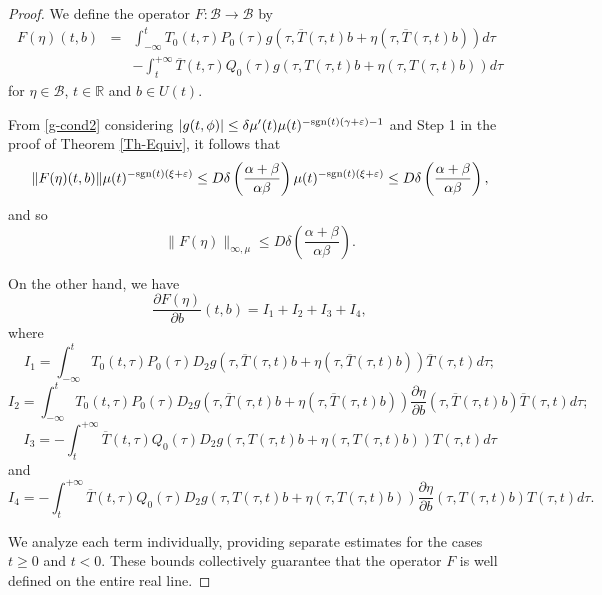 \documentclass[9pt]{amsart}
\numberwithin{equation}{section}
\numberwithin{lemma}{section}
\begin{document}
\begin{proof}
    We define the operator $F\colon\mathcal{B}\to \mathcal{B}$ by
    \begin{equation*}
        \begin{array}{rcl}
            F(\eta)(t,b) & = & \displaystyle\int_{-\infty}^{t} T_0(t,\tau)P_0(\tau)g(\tau,\overline{T}(\tau,t)b+\eta(\tau,\overline{T}(\tau,t)b))d\tau \\
             & & -\displaystyle\int_{t}^{+\infty}\overline{T}(t,\tau)Q_0(\tau)g(\tau, T(\tau,t)b+\eta(\tau,T(\tau,t)b))d\tau
        \end{array}
    \end{equation*}
    for $\eta\in\mathcal{B}$, $t\in\mathbb{R}$ and $b\in U(t)$.

    From \eqref{g-cond2} considering $|g(t,\phi)|\leq \delta\mu'(t)\mu(t)^{-\textnormal{sgn}(t)(\gamma+\varepsilon)-1}$  and Step 1 in the proof of Theorem \ref{Th-Equiv}, it follows that
    $$\|F(\eta)(t,b)\|\mu(t)^{-\textnormal{sgn}(t)(\xi+\varepsilon)}\leq D\delta\left(\frac{\alpha+\beta}{\alpha\beta}\right)\mu(t)^{-\textnormal{sgn}(t)(\xi+\varepsilon)}\leq D\delta\left(\frac{\alpha+\beta}{\alpha\beta}\right),$$
    and so
    \begin{equation}\label{F-cota-mu}
        \|F(\eta)\|_{\infty,\mu} \leq D\delta\left(\frac{\alpha+\beta}{\alpha\beta}\right).
    \end{equation}

    On the other hand, we have 
$$ \displaystyle{\frac{\partial F(\eta)}{\partial b}(t,b)}= I_1 + I_2 + I_3 + I_4,$$
where
$$I_1 = \displaystyle\int_{-\infty}^{t}T_0(t,\tau)P_0(\tau)D_2g(\tau,\overline{T}(\tau,t)b+\eta(\tau,\overline{T}(\tau,t)b))\overline{T}(\tau,t)d\tau;$$
$$I_2 =  \displaystyle\int_{-\infty}^{t}T_0(t,\tau)P_0(\tau)D_2g(\tau,\overline{T}(\tau,t)b+\eta(\tau,\overline{T}(\tau,t)b))\frac{\partial\eta}{\partial b}(\tau,\overline{T}(\tau,t)b)\overline{T}(\tau,t)d\tau ;$$
$$I_3 = -\displaystyle\int_{t}^{+\infty}\overline{T}(t,\tau)Q_0(\tau)D_2g(\tau,T(\tau,t)b+\eta(\tau,T(\tau,t)b))T(\tau,t)d\tau $$
and
$$I_4 = -\displaystyle\int_{t}^{+\infty}\overline{T}(t,\tau)Q_0(\tau)D_2g(\tau,T(\tau,t)b+\eta(\tau,T(\tau,t)b))\frac{\partial\eta}{\partial b}(\tau,T(\tau,t)b)T(\tau,t)d\tau.$$
    
We analyze each term individually, providing separate estimates for the cases \(t \geq 0\) and \(t < 0\). These bounds collectively guarantee that the operator \(F\) is well defined on the entire real line.
  


\end{proof}
\end{document}
